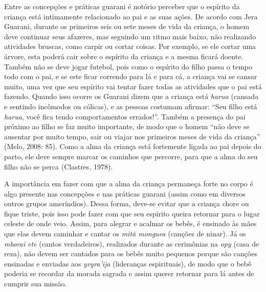 Entre as concepções e práticas guarani é notório perceber que o espírito
da criança está intimamente relacionado ao pai e as suas ações. De
acordo com Jera Guarani, durante os primeiros seis ou sete meses de
vida da criança, o homem deve continuar seus afazeres, mas seguindo um
ritmo mais baixo, não realizando atividades bruscas, como carpir ou
cortar coisas. Por exemplo, se ele cortar uma árvore, esta poderá cair
sobre o espírito da criança e a mesma ficará doente. Também não se deve
jogar futebol, pois como o espírito do filho passa o tempo todo com o
pai, e se este ficar correndo para lá e para cá, a criança vai se
cansar muito, uma vez que seu espírito vai tentar fazer todas as
atividades que o pai está fazendo. Quando isso ocorre os Guarani dizem
que a criança está \emph{harua} (cansada e sentindo incômodos ou cólicas), e
as pessoas costumam afirmar: ``Seu filho está \emph{harua}, você fica tendo
comportamentos errados!''. Também a presença do pai próximo ao filho se
faz muito importante, de modo que o homem ``não deve se ausentar por
muito tempo, sair ou viajar nos primeiros meses de vida da criança''
(Melo, 2008: 85). Como a alma da criança está fortemente ligada ao pai
depois do parto, ele deve sempre marcar os caminhos que percorre, para
que a alma do seu filho não se perca (Clastres, 1978).

A importância em fazer com que a alma da criança permaneça forte no
corpo é algo presente nas concepções e nas práticas guarani (assim como
em diversos outros grupos ameríndios). Dessa forma, deve-se evitar que a
criança chore ou fique triste, pois isso pode fazer com que seu
espírito queira retornar para o lugar celeste de onde veio. Assim, para
alegrar e acalmar os bebês, é ensinado às mães que elas devem caminhar
e cantar os \emph{mitã monguea} (canções de ninar). Já os \emph{mborai ete} (cantos
verdadeiros), realizados durante as cerimônias na \emph{opy} (casa de reza),
não devem ser cantados para os bebês muito pequenos porque são canções
ensinadas e enviadas aos \emph{yvyra’ija} (lideranças espirituais), de modo
que o bebê poderia se recordar da morada sagrada e assim querer
retornar para lá antes de cumprir sua missão.

